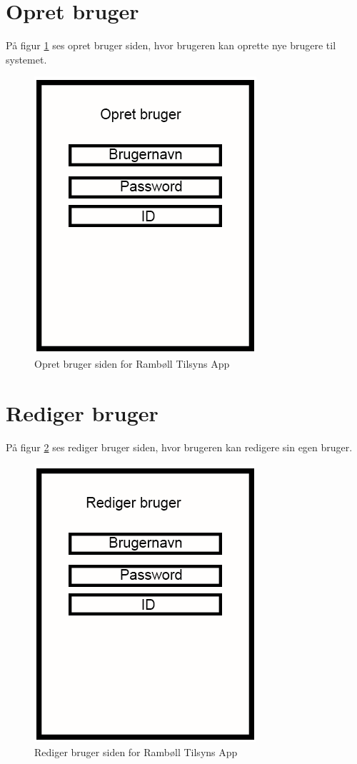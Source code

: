 \section{Opret bruger}\label{sec:OpretBrugerMock}
På figur \ref{fig:OpretBrugerMock} ses opret bruger siden, hvor brugeren kan oprette nye brugere til systemet.

\begin{figure}[H]
	\centering
	\includegraphics[width=0.4\linewidth]{MockUps/Mock/Ramboell-OpretBruger}
	\caption{Opret bruger siden for Rambøll Tilsyns App}
	\label{fig:OpretBrugerMock}
\end{figure}

\clearpage

\section{Rediger bruger}\label{sec:RedigerBrugerMock}
På figur \ref{fig:RedigerBrugerMock} ses rediger bruger siden, hvor brugeren kan redigere sin egen bruger.

\begin{figure}[H]
	\centering
	\includegraphics[width=0.4\linewidth]{MockUps/Mock/Ramboell-RedigerBruger}
	\caption{Rediger bruger siden for Rambøll Tilsyns App}
	\label{fig:RedigerBrugerMock}
\end{figure}

